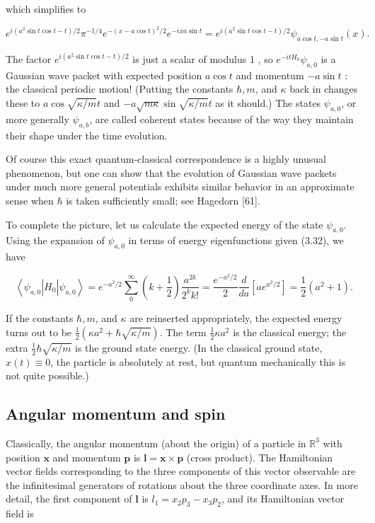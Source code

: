 \documentclass[10pt, letterpaper]{article}
\begin{document}
which simplifies to

$$
e^{i\left(a^{2} \sin t \cos t-t\right) / 2} \pi^{-1 / 4} e^{-(x-a \cos t)^{2} / 2} e^{-i x a \sin t}=e^{i\left(a^{2} \sin t \cos t-t\right) / 2} \psi_{a \cos t,-a \sin t}(x) .
$$

The factor $e^{i\left(a^{2} \sin t \cos t-t\right) / 2}$ is just a scalar of modulus 1 , so $e^{-i t H_{0}} \psi_{a, 0}$ is a Gaussian wave packet with expected position $a \cos t$ and momentum $-a \sin t$ : the classical periodic motion! (Putting the constants $\hbar, m$, and $\kappa$ back in changes these to $a \cos \sqrt{\kappa / m} t$ and $-a \sqrt{m \kappa} \sin \sqrt{\kappa / m} t$ as it should.) The states $\psi_{a, 0}$, or more generally $\psi_{a, b}$, are called coherent states because of the way they maintain their shape under the time evolution.

Of course this exact quantum-classical correspondence is a highly unusual phenomenon, but one can show that the evolution of Gaussian wave packets under much more general potentials exhibits similar behavior in an approximate sense when $\hbar$ is taken sufficiently small; see Hagedorn [61].

To complete the picture, let us calculate the expected energy of the state $\psi_{a, 0}$. Using the expansion of $\psi_{a, 0}$ in terms of energy eigenfunctions given (3.32), we have

$$
\left\langle\psi_{a, 0}\right| H_{0}\left|\psi_{a, 0}\right\rangle=e^{-a^{2} / 2} \sum_{0}^{\infty}\left(k+\frac{1}{2}\right) \frac{a^{2 k}}{2^{k} k!}=\frac{e^{-a^{2} / 2}}{2} \frac{d}{d a}\left[a e^{a^{2} / 2}\right]=\frac{1}{2}\left(a^{2}+1\right) .
$$

If the constants $\hbar, m$, and $\kappa$ are reinserted appropriately, the expected energy turns out to be $\frac{1}{2}\left(\kappa a^{2}+\hbar \sqrt{\kappa / m}\right)$. The term $\frac{1}{2} \kappa a^{2}$ is the classical energy; the extra $\frac{1}{2} \hbar \sqrt{\kappa / m}$ is the ground state energy. (In the classical ground state, $x(t) \equiv 0$, the particle is absolutely at rest, but quantum mechanically this is not quite possible.)

\subsection*{Angular momentum and spin}
Classically, the angular momentum (about the origin) of a particle in $\mathbb{R}^{3}$ with position $\mathbf{x}$ and momentum $\mathbf{p}$ is $\mathbf{l}=\mathbf{x} \times \mathbf{p}$ (cross product). The Hamiltonian vector fields corresponding to the three components of this vector observable are the infinitesimal generators of rotations about the three coordinate axes. In more detail, the first component of $\mathbf{l}$ is $l_{1}=x_{2} p_{3}-x_{3} p_{2}$, and its Hamiltonian vector field is
\end{document}
